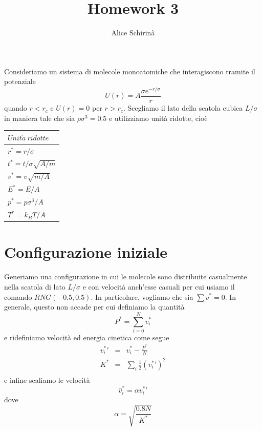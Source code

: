 \documentclass[a4paper,11pt]{article}
\begin{document}
\title{\sc Homework 3}
\author{\sc Alice Schirinà}
\maketitle

\noindent Consideriamo un sistema di molecole monoatomiche che interagiscono tramite il potenziale 
\begin{equation*}
U(r) = A \frac{\sigma e^{-r/\sigma}}{r}
\end{equation*}
quando $ r <r_c $ e $U(r) = 0$ per $ r >r_c $. Scegliamo il lato della scatola cubica $ L/\sigma $ in maniera tale che sia $\rho \sigma^3=0.5$ e utilizziamo unità ridotte, cioè
\begin{table}[H]
	\centering
	\begin{tabular}{l} 
		\hline
		 $Unit\grave{a}\ ridotte$ \\
		\hline
		$r^* = r/\sigma$	\\
		$t^* = t/\sigma \sqrt{A/m}$	\\
		$v^* = v\sqrt{m/A}$	\\
		$E^* = E/A$	\\
		$p^* = p \sigma^3/A$	\\
		$T^* = k_B T/A$	\\\hline
	\end{tabular}
\end{table}
\medskip
\noindent \section*{Configurazione iniziale}
Generiamo una configurazione in cui le molecole sono distribuite casualmente nella scatola di lato $ L/\sigma $ e con velocità anch'esse casuali per cui usiamo il comando $RNG(-0.5,0.5)$. In particolare, vogliamo che sia $\sum v^* = 0$. In generale, questo non accade per cui definiamo la quantità
\begin{equation*}
P^* = \sum_{i=0}^N v_i^*
\end{equation*}
e ridefiniamo velocità ed energia cinetica come segue
\begin{eqnarray}
{v_i^*}' &=& v_i^* - \frac{P^*}{N}\\
K^* &=& \sum_i \frac{1}{2} ({v_i^*}')^2\\
\end{eqnarray}
e infine scaliamo le velocità
\begin{equation*}
\hat{v}_i^* = \alpha {v_i^*}'
\end{equation*}
dove 
\begin{equation*}
\alpha = \sqrt{\frac{0.8N}{K^*}}
\end{equation*}
\end{document}
